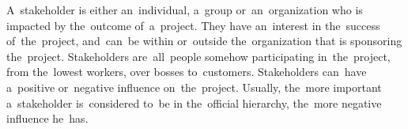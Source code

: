 A~stakeholder is either an~individual, a~group or~an~organization who is impacted by the~outcome of~a~project.
They have an~interest in the~success of~the~project, and~can~be within or~outside the~organization that is sponsoring the~project.
Stakeholders are~all~people somehow participating in~the~project, from the~lowest workers, over bosses to~customers.
Stakeholders can~have a~positive or~negative influence on~the~project.
Usually, the~more important a~stakeholder is~considered to~be in the~official hierarchy, the~more negative influence he~has.
\newpage
